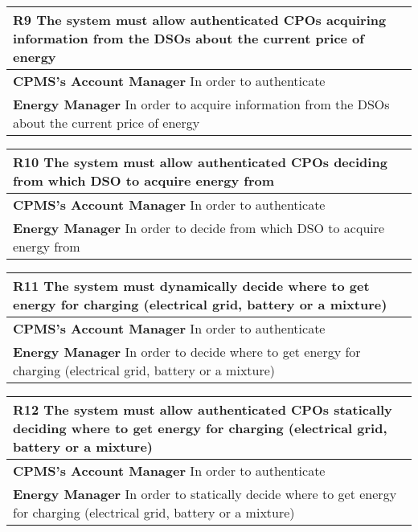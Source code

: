 \begin{table}[H]
    \begin{tabularx}{\textwidth}{X}
        \toprule
        \textbf{R9} The system must allow authenticated CPOs acquiring information from the
        DSOs about the current price of energy                                                                  \\ \midrule
        \textbf{CPMS's Account Manager}  In order to authenticate                                               \\
        \textbf{Energy Manager} In order to acquire information from the DSOs about the current price of energy \\
    \end{tabularx}
\end{table}
\begin{table}[H]
    \begin{tabularx}{\textwidth}{X}
        \toprule
        \textbf{R10} The system must allow authenticated CPOs deciding from which DSO to
        acquire energy from                                      \\ \midrule
        \textbf{CPMS's Account Manager} In order to authenticate \\
        \textbf{Energy Manager} In order to decide from which DSO to
        acquire energy from                                      \\
    \end{tabularx}
\end{table}
\begin{table}[H]
    \begin{tabularx}{\textwidth}{X}
        \toprule
        \textbf{R11} The system must dynamically decide where to get energy for charging (electrical
        grid, battery or a mixture)                              \\ \midrule
        \textbf{CPMS's Account Manager} In order to authenticate \\
        \textbf{Energy Manager} In order to decide where to get energy for charging (electrical
        grid, battery or a mixture)                              \\
    \end{tabularx}
\end{table}
\begin{table}[H]
    \begin{tabularx}{\textwidth}{X}
        \toprule
        \textbf{R12} The system must allow authenticated CPOs statically deciding where to get
        energy for charging (electrical grid, battery or a mixture) \\ \midrule
        \textbf{CPMS's Account Manager} In order to authenticate    \\
        \textbf{Energy Manager} In order to statically decide where to get
        energy for charging (electrical grid, battery or a mixture) \\
    \end{tabularx}
\end{table}
